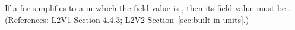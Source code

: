 If a \UnitDefinition for  simplifies to a \Unit in which 
the  field value is , then its 
field value must be . (References: L2V1 Section 4.4.3; L2V2
Section~\ref{sec:built-in-units}.)
